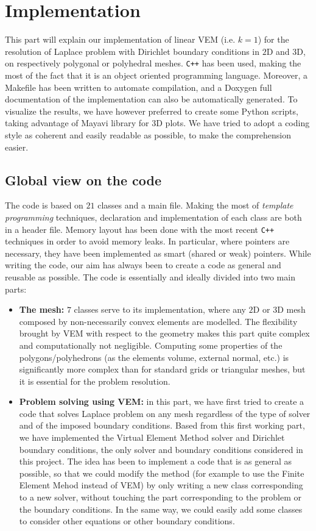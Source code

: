 \newpage
\section{Implementation}

This part will explain our implementation of linear VEM (i.e. $k=1$) for the resolution of Laplace problem with Dirichlet boundary conditions in $2$D and $3$D, on respectively polygonal or polyhedral meshes. \verb!C++! has been used, making the most of the fact that it is an object oriented programming language. Moreover, a Makefile has been written to automate compilation, and a Doxygen full documentation of the implementation can also be automatically generated. To visualize the results, we have however preferred to create some Python scripts, taking advantage of Mayavi library for $3$D plots. We have tried to adopt a coding style as coherent and easily readable as possible, to make the comprehension easier. 

\subsection{Global view on the code}
The code is based on $21$ classes and a main file. Making the most of \textit{template programming} techniques, declaration and implementation of each class are both in a header file. Memory layout has been done with the most recent \verb!C++! techniques in order to avoid memory leaks. In particular, where pointers are necessary, they have been implemented as smart (shared or weak) pointers. While writing the code, our aim has always been to create a code as general and reusable as possible. The code is essentially and ideally divided into two main parts:
\begin{itemize}
\item \textbf{The mesh:} $7$ classes serve to its implementation, where any $2$D or $3$D mesh composed by non-necessarily convex elements are modelled. The flexibility brought by VEM with respect to the geometry makes this part quite complex and computationally not negligible. Computing some properties of the polygons/polyhedrons (as the elements volume, external normal, etc.) is significantly more complex than for standard grids or triangular meshes, but it is essential for the problem resolution. 
\item \textbf{Problem solving using VEM:} in this part, we have first tried to create a code that solves Laplace problem on any mesh regardless of the type of solver and of the imposed boundary conditions. Based from this first working part, we have implemented the Virtual Element Method solver and Dirichlet boundary conditions, the only solver and boundary conditions considered in this project. The idea has been to implement a code that is as general as possible, so that we could modify the method (for example to use the Finite Element Mehod instead of VEM) by only writing a new class corresponding to a new solver, without touching the part corresponding to the problem or the boundary conditions. In the same way, we could easily add some classes to consider other equations or other boundary conditions. 
\end{itemize}

